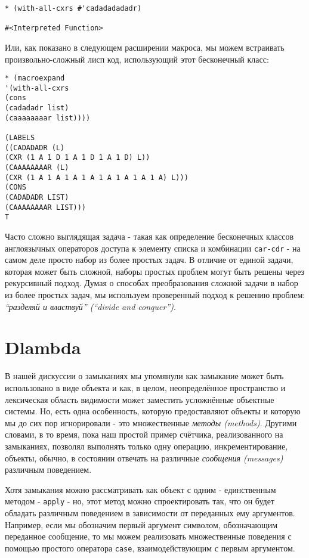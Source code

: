 \begin{verbatim}
* (with-all-cxrs #'cadadadadadr)

#<Interpreted Function>
\end{verbatim}

Или, как показано в следующем расширении макроса, мы можем встраивать произвольно-сложный лисп код, использующий этот бесконечный класс:

\begin{verbatim}
* (macroexpand
'(with-all-cxrs
(cons
(cadadadr list)
(caaaaaaaar list))))

(LABELS
((CADADADR (L)
(CXR (1 A 1 D 1 A 1 D 1 A 1 D) L))
(CAAAAAAAAR (L)
(CXR (1 A 1 A 1 A 1 A 1 A 1 A 1 A 1 A) L)))
(CONS
(CADADADR LIST)
(CAAAAAAAAR LIST)))
T
\end{verbatim}

Часто сложно выглядящая задача - такая как определение бесконечных классов англоязычных операторов доступа к элементу списка и комбинации \verb"car-cdr" - на самом деле просто набор из более простых задач. В отличие от единой задачи, которая может быть сложной, наборы простых проблем могут быть решены через рекурсивный подход. Думая о способах преобразования сложной задачи в набор из более простых задач, мы используем проверенный подход к решению проблем: \emph{``разделяй и властвуй'' (``divide and conquer'')}.

\section{Dlambda}\label{section_dlambda}

В нашей дискуссии о замыканиях мы упомянули как замыкание может быть использовано в виде объекта и как, в целом, неопределённое пространство и лексическая область видимости может заместить усложнённые объектные системы. Но, есть одна особенность, которую предоставляют объекты и которую мы до сих пор игнорировали - это множественные \emph{методы (methods)}. Другими словами, в то время, пока наш простой пример счётчика, реализованного на замыканиях, позволял выполнять только одну операцию, инкрементирование, объекты, обычно, в состоянии отвечать на различные \emph{сообщения (messages)} различным поведением.

Хотя замыкания можно рассматривать как объект с одним - единственным методом - \verb"apply" - но, этот метод можно спроектировать так, что он будет обладать различным поведением в зависимости от переданных ему аргументов. Например, если мы обозначим первый аргумент символом, обозначающим переданное сообщение, то мы можем реализовать множественные поведения с помощью простого оператора \verb"case", взаимодействующим с первым аргументом.

